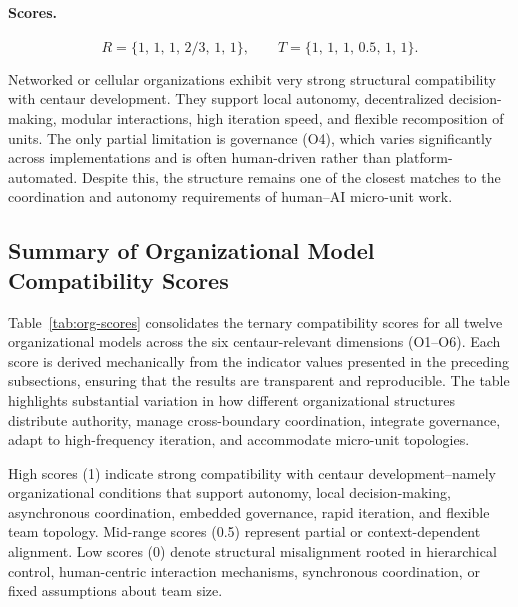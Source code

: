 \documentclass[11pt, a4paper, twocolumn]{article} %
\begin{document}
\paragraph{Scores.}

\[
R = \{1,\,1,\,1,\,2/3,\,1,\,1\},
\qquad
T = \{1,\,1,\,1,\,0.5,\,1,\,1\}.
\]

Networked or cellular organizations exhibit very strong structural compatibility
with centaur development. They support local autonomy, decentralized decision-
making, modular interactions, high iteration speed, and flexible recomposition
of units. The only partial limitation is governance (O4), which varies
significantly across implementations and is often human-driven rather than
platform-automated. Despite this, the structure remains one of the closest
matches to the coordination and autonomy requirements of human--AI micro-unit
work.

\newpage
\subsection*{Summary of Organizational Model Compatibility Scores}

Table~\ref{tab:org-scores} consolidates the ternary compatibility scores for all
twelve organizational models across the six centaur-relevant dimensions (O1--O6).
Each score is derived mechanically from the indicator values presented in the
preceding subsections, ensuring that the results are transparent and reproducible.
The table highlights substantial variation in how different organizational
structures distribute authority, manage cross-boundary coordination, integrate
governance, adapt to high-frequency iteration, and accommodate micro-unit
topologies.

High scores (1) indicate strong compatibility with centaur development--namely
organizational conditions that support autonomy, local decision-making,
asynchronous coordination, embedded governance, rapid iteration, and flexible
team topology. Mid-range scores (0.5) represent partial or context-dependent
alignment. Low scores (0) denote structural misalignment rooted in hierarchical
control, human-centric interaction mechanisms, synchronous coordination, or
fixed assumptions about team size.
\end{document}
